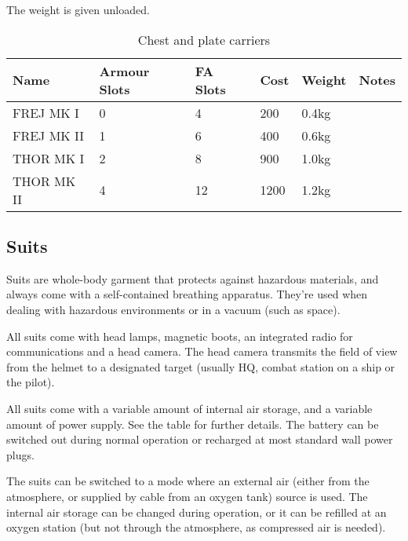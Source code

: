 The weight is given unloaded.

\begin{table}
  \caption{Chest and plate carriers}
  \label{tab:Carriers}
  \begin{center}
    \begin{tabular}{| l | l | l | l | l | l |}

      \hline
      \textbf{Name} & \textbf{Armour Slots} & \textbf{FA Slots} &
      \textbf{Cost} & \textbf{Weight} & \textbf{Notes} \\ \hline

      FREJ MK I   & 0 &  4 &  200 & 0.4kg & \\ \hline
      FREJ MK II  & 1 &  6 &  400 & 0.6kg & \\ \hline

      THOR MK I   & 2 &  8 &  900 & 1.0kg & \\ \hline
      THOR MK II  & 4 & 12 & 1200 & 1.2kg & \\ \hline

    \end{tabular}
  \end{center}
\end{table}

\subsection{Suits}
\label{sub:10-Suits}

Suits are whole-body garment that protects against hazardous materials, and
always come with a self-contained breathing apparatus. They're used when dealing
with hazardous environments or in a vacuum (such as space).

All suits come with head lamps, magnetic boots, an integrated radio for
communications and a head camera. The head camera transmits the field of view
from the helmet to a designated target (usually HQ, combat station on a ship or
the pilot).

All suits come with a variable amount of internal air storage, and a variable
amount of power supply. See the table for further details. The battery can be
switched out during normal operation or recharged at most standard wall power
plugs.

The suits can be switched to a mode where an external air (either from the
atmosphere, or supplied by cable from an oxygen tank) source is used.  The
internal air storage can be changed during operation, or it can be refilled at
an oxygen station (but not through the atmosphere, as compressed air is needed).

